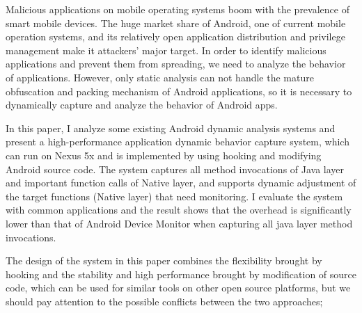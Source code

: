 



\begin{enabstract}
Malicious applications on mobile operating systems boom with the prevalence of smart mobile devices. The huge market share of Android, one of current mobile operation systems, and its relatively open application distribution and privilege management make it attackers' major target. In order to identify malicious applications and prevent them from spreading, we need to analyze the behavior of applications. However,  only static analysis can not handle the mature obfuscation and packing mechanism of Android applications, so it is necessary to dynamically capture and analyze the behavior of Android apps.

In this paper, I analyze some existing Android dynamic analysis systems and present a high-performance application dynamic behavior capture system, which can run on Nexus 5x and is implemented by using hooking and modifying Android source code. The system captures all method invocations of Java layer and important function calls of Native layer, and supports dynamic adjustment of the target functions (Native layer) that need monitoring. I evaluate the system with common applications and the result shows that the overhead is significantly lower than that of Android Device Monitor when capturing all java layer method invocations.

The design of the system in ​​this paper combines the flexibility brought by hooking and the stability and high performance brought by modification of source code, which can be used for similar tools on other open source platforms, but we should pay attention to the possible conflicts between the two approaches;

\end{enabstract}
\par
\vspace*{2em}

